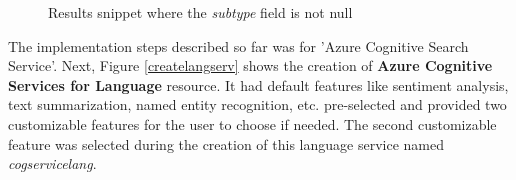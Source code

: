 \begin {figure}[h!h]
    \centering
    \caption{Results snippet where the \textit{subtype} field is not null}
    \label{datesubtype}
\end {figure}
\newpage
The implementation steps described so far was for 'Azure Cognitive Search Service'. Next, Figure \ref{createlangserv} shows the creation of \textbf{Azure Cognitive Services for Language} resource. It had default features like sentiment analysis, text summarization, named entity recognition, etc. pre-selected and provided two customizable features for the user to choose if needed. The second customizable feature was selected during the creation of this language service named \textit{cogservicelang}.
